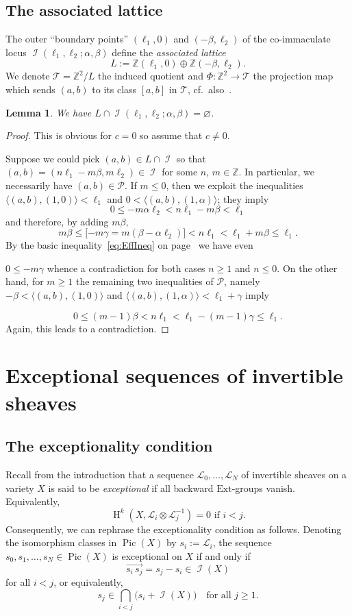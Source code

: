 \documentclass[11pt]{article}
\newtheorem{lemma}[theo]{Lemma}
\theoremstyle{definition}
\numberwithin{equation}{section}
\newcommand{\cP}{\mathcal{P}}
\newcommand{\Z}{\mathbb Z}
\newcommand{\CI}{{\mathcal I}}
\newcommand{\CL}{{\mathcal L}}
\newcommand{\CT}{{\mathcal T}}
\newcommand{\gH}{\operatorname{H}}
\newcommand{\Pic}{\operatorname{Pic}}
\newcommand{\vect}{\overrightarrow}
\newcommand{\nImm}{\operatorname{\CI}}
\newcommand{\xa}{\alpha}
\newcommand{\xb}{\beta}
\newcommand{\xc}{{\gamma}}
\newcommand{\gammaText}[1]{{#1}}
\newcommand{\noGammaText}[1]{}
\newcommand{\cl}{s}
\begin{document}
\subsection{The associated lattice}
\label{subsec:AssLat}
The outer ``boundary points'' $(\ell_1,0)$ and 
$(-\xb,\ell_2)$ of the {co-immaculate} locus
$\nImm(\ell_1,\ell_2;\xa,\xb)$ 
define the {\em associated lattice}
$$
L:=\Z(\ell_1,0)\oplus\Z(-\xb,\ell_2).
$$
We denote $\CT=\Z^2/L$ the induced quotient 
and $\Phi:\Z^2\to\CT$ the projection map 
which sends $(a,b)$ to its class $[a,b]$ in $\CT$,
cf.\ also~\cite[Section 4]{p1p1p1}.

\begin{lemma}
\label{lem:LImm}
We have $L\cap\nImm(\ell_1,\ell_2;\xa,\xb)=\varnothing$. 
\end{lemma}

\begin{proof}
This is obvious for $c=0$ so assume that $c\not=0$.

Suppose we could pick $(a,b)\in L\cap\nImm$ so that 
$(a,b)=(n\ell_1-m\xb,m\ell_2)\in\nImm$ for some $n$, 
$m\in\Z$. In particular, we necessarily have 
$(a,b)\in\cP$. If $m\leq0$, 
{then we exploit the inequalities
$\langle (a,b),(1,0)\rangle <\ell_1$ and
$0<\langle (a,b),(1,\xa)\rangle$; they imply
}
$$
0\leq -m\xa\ell_2<n\ell_1-m\xb<\ell_1
$$ 
and therefore, {by adding $m\xb$,} 
$$
{m\xb\leq
\big[}\gammaText{-m\xc=}
m(\xb-\xa\ell_2)\big]<n\ell_1<\ell_1 +m\xb \leq \ell_1.
$$
By the basic inequality~\eqref{eq:EffIneq} 
on page~\pageref{eq:EffIneq} we have {even}
\noGammaText{$0\leq m(\xb-\xa\ell_2)$}
\gammaText{$0\leq -m\xc$}
whence a contradiction for both cases $n\geq 1$ 
and $n\leq 0$. 
{On the other hand, for $m\geq1$ the 
remaining two inequalities of $\cP$, namely
$-\xb<\langle (a,b),(1,0)\rangle$ and
$\langle (a,b),(1,\xa)\rangle<\ell_1+\xc$ imply
}
\noGammaText{
$$
-\xb<n\ell_1-m\xb<\ell_1-\xb-(m-1)\xa\ell_2
$$
and therefore 
$$
0\leq(m-1)\xb<n\ell_1<\ell_1+(m-1)(\xb-\ell_2\xa)
\leq\ell_1.
$$
}
\gammaText{
$$
0\leq(m-1)\xb<n\ell_1<\ell_1-(m-1)\xc\leq\ell_1.
$$
}
{Again, this leads to a contradiction.}
\end{proof}

\section{Exceptional sequences of invertible sheaves}
\label{sec:ExcSeq}
\subsection{The exceptionality condition}
\label{subsubsec:ExcCon}
Recall from the introduction that a 
sequence $\CL_0,\ldots,\CL_N$ of 
invertible sheaves on a variety $X$ 
is said to be {\em exceptional} if 
all backward $\mathrm{Ext}$-groups 
vanish. Equivalently, 
$$
\gH^k(X,\CL_i\otimes\CL_j^{-1})=0\mbox{ if }i<j.
$$
Consequently, we can 
rephrase the exceptionality condition 
as follows. Denoting the isomorphism 
classes in $\Pic(X)$ by $\cl_i:=\CL_i$, 
the sequence
$\cl_0,\cl_1,\ldots,\cl_N\in\Pic(X)$ is 
exceptional on $X$ if and only if 
$$
\vect{\cl_i\,\cl_j}=\cl_j-\cl_i\in\nImm(X)
$$
for all $i<j$, or equivalently,
$$
\cl_j\in\bigcap_{i<j} \big(\cl_i+\nImm(X)\big)
\quad\mbox{for all }j\geq 1.
$$
\end{document}
